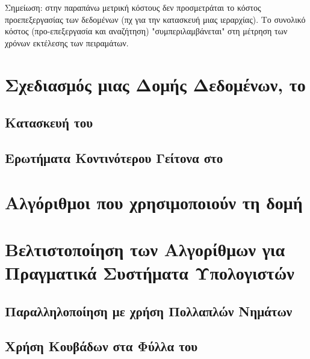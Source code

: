 Σημείωση: στην παραπάνω μετρική κόστους δεν προσμετράται το κόστος προεπεξεργασίας 
των δεδομένων (πχ για την κατασκευή μιας ιεραρχίας).
Το συνολικό κόστος (προ-επεξεργασία και αναζήτηση) "συμπεριλαμβάνεται" στη
μέτρηση των χρόνων εκτέλεσης των πειραμάτων.


\section{Σχεδιασμός μιας  Δομής Δεδομένων, το }
\label{sec:design_bvh}

\subsection{Κατασκευή του }
\subsection{Ερωτήματα Κοντινότερου Γείτονα στο }

\section{Αλγόριθμοι που χρησιμοποιούν τη δομή }

\section{Βελτιστοποίηση των Αλγορίθμων για Πραγματικά Συστήματα Υπολογιστών}
\subsection{Παραλληλοποίηση με χρήση Πολλαπλών Νημάτων }
\subsection{Χρήση Κουβάδων στα Φύλλα του }